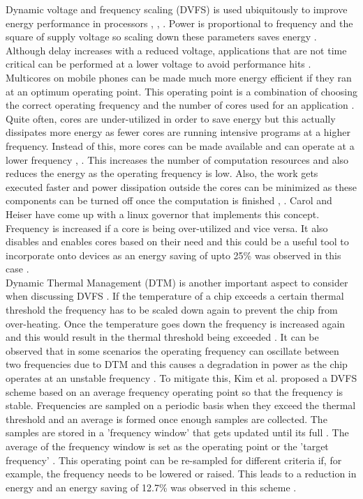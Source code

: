 \documentclass[journal]{IEEEtran}
\begin{document}
Dynamic voltage and frequency scaling (DVFS) is used ubiquitously to improve energy performance in processors \cite{LinuxGov}, \cite{TempDVFS}, \cite{48Core}. Power is proportional to frequency and the square of supply voltage so scaling down these parameters saves energy \cite{TempDVFS}. Although delay increases with a reduced voltage, applications that are not time critical can be performed at a lower voltage to avoid performance hits \cite{LinuxGov}. Multicores on mobile phones can be made much more energy efficient if they ran at an optimum operating point. This operating point is a combination of choosing the correct operating frequency and the number of cores used for an application \cite{LinuxGov}. Quite often, cores are under-utilized in order to save energy but this actually dissipates more energy as fewer cores are running intensive programs at a higher frequency. Instead of this, more cores can be made available and can operate at a lower frequency \cite{LinuxGov}, \cite{MultiCores}. This increases the number of computation resources and also reduces the energy as the operating frequency is low. Also, the work gets executed faster and power dissipation outside the cores can be minimized as these components can be turned off once the computation is finished \cite{LinuxGov}, \cite{MultiCores}. Carol and Heiser \cite{LinuxGov} have come up with a linux governor that implements this concept. Frequency is increased if a core is being over-utilized and vice versa. It also disables and enables cores based on their need and this could be a useful tool to incorporate onto devices as an energy saving of upto 25\% was observed in this case \cite{LinuxGov}.\\

Dynamic Thermal Management (DTM) is another important aspect to consider when discussing DVFS \cite{TempDVFS}. If the temperature of a chip exceeds a certain thermal threshold the frequency has to be scaled down again to prevent the chip from over-heating. Once the temperature goes down the frequency is increased again and this would result in the thermal threshold being exceeded \cite{TempDVFS}. It can be observed that in some scenarios the operating frequency can oscillate between two frequencies due to DTM and this causes a degradation in power as the chip operates at an unstable frequency \cite{TempDVFS}. To mitigate this, Kim et al. \cite{TempDVFS} proposed a DVFS scheme based on an average frequency operating point so that the frequency is stable. Frequencies are sampled on a periodic basis when they exceed the thermal threshold and an average is formed once enough samples are collected. The samples are stored in a 'frequency window' that gets updated until its full \cite{TempDVFS}. The average of the frequency window is set as the operating point or the 'target frequency' \cite{TempDVFS}. This operating point can be re-sampled for different criteria if, for example, the frequency needs to be lowered or raised. This leads to a reduction in energy and an energy saving of 12.7\% was observed in this scheme \cite{TempDVFS}.
\end{document}
